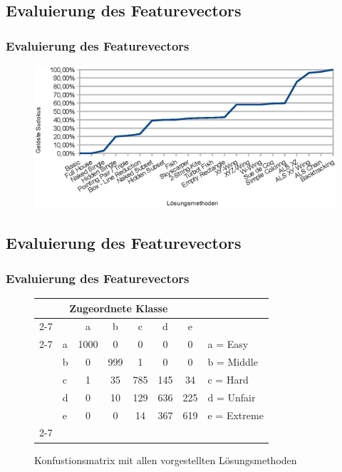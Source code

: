 \documentclass[accentcolor=tud6b,colorbacktitle,inverttitle,landscape,german,presentation,t]{tudbeamer}
\begin{document}
	\subsection{Evaluierung des Featurevectors}
		\begin{frame}
		\frametitle{Evaluierung des Featurevectors}
		\begin{figure}[Hh]
		\includegraphics[width=\textwidth,height=\textheight,keepaspectratio]{./img/solvedcount.eps}
		\end{figure}
		\end{frame}

	\subsection{Evaluierung des Featurevectors}
		\begin{frame}
		\frametitle{Evaluierung des Featurevectors}
		\begin{figure}[Hh]
		\centering
		\begin{tabular}{ l | l |  c  c  c  c  c | l}
		\multicolumn{7}{c}{\textbf{Zugeordnete Klasse}}\\
		\cline{2-7}
		\multirow{6}{*}{\begin{turn}{90}\textbf{Klasse}\end{turn}}
		 &  & a & b & c & d & e\\
		\cline{2-7}
		& a & 1000 & 0 & 0 & 0 & 0 & a = Easy \\
		& b & 0 & 999 & 1 & 0 & 0 & b = Middle \\
		& c & 1 & 35 & 785 & 145 & 34 & c = Hard \\
		& d & 0 & 10 & 129 & 636 & 225 & d = Unfair \\
		& e & 0 & 0 & 14 & 367 & 619 & e = Extreme \\
		\cline{2-7}
		\end{tabular}
		\caption{Konfustionsmatrix mit allen vorgestellten Lösungsmethoden}
		\end{figure}
		\end{frame}
\end{document}

